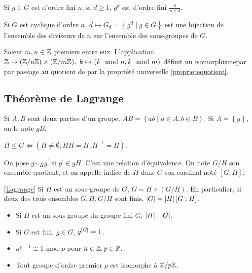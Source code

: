 \documentclass{cours}
\begin{document}
\begin{remark}
    Si $g \in G$ est d'ordre fini $n$, si $d \geq 1$, $g^{d}$ est d'ordre fini $\frac{n}{n \wedge d}$.
\end{remark}

\begin{proposition}
    Si $G$ est cyclique d'ordre $n$, $d \mapsto G_{d} = \left\{g^{d} \mid g \in G\right\}$ est une bijection de l'ensemble des diviseurs de $n$ sur l'ensemble des sous-groupes de $G$.
\end{proposition}

\begin{theorem}[Chinois]
    Soient $m, n \in \mathbb{Z}$ premiers entre eux. L'application $\mathbb{Z} \rightarrow (\mathbb{Z}/n\mathbb{Z}) \times (\mathbb{Z}/m\mathbb{Z}),\ k \mapsto \left(k \mod n, k \mod m\right)$ définit un isomorphismepar par passage au quotient de par la propriété universelle \ref{proprietequotient}.
\end{theorem}

\subsection{Théorème de Lagrange} %
\begin{definition}
    Si $A, B$ sont deux parties d'un groupe, $AB = \left\{ab \mid a \in A, b\in B\right\}$. Si $A = \left\{g\right\}$, on le note $gB$.
\end{definition}
\begin{lemma}
    $H \leq G \Leftrightarrow \left(H \neq \emptyset, HH = H, H^{-1} = H\right)$.
\end{lemma}
\begin{definition}
    On pose $g\sim_{H}g^{'}$ si $g^{'} \in gH$. C'est une relation d'équivalence. On note $G/H$ son ensemble quotient, et on appelle indice de $H$ dans $G$ son cardinal noté $[G : H]$.
\end{definition}

\begin{theorem}[Lagrange]\ref{Lagrange}
    Si $H$ est un sous-groupe de $G$, $G \sim H \times (G/H)$. En particulier, si deux des trois ensembles $G, H, G/H$ sont finis, $\left|G\right| = \left|H\right|\left[G : H\right]$.
\end{theorem}
\begin{corollary}
    \begin{itemize}
        \item Si $H$ est un sous-groupe du groupe fini $G$, $\left|H\right| \mid \left|G\right|$.
        \item Si $G$ est fini, $g\in G$, $g^{\left|G\right|} = 1$.
        \item $n^{p-1} \cong 1 \text{ mod } p$ pour $n\in \mathbb{Z}, p \in \mathbb{P}$.
        \item Tout groupe d'ordre premier $p$ est isomorphe à $\mathbb{Z}/p\mathbb{Z}$.
    \end{itemize}
\end{corollary}
\end{document}
